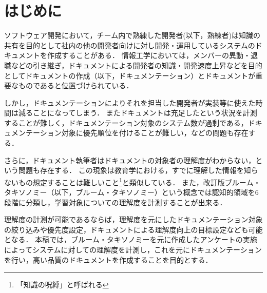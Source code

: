 \section{はじめに}
ソフトウェア開発において，チーム内で熟練した開発者(以下，熟練者)は知識の共有を目的として社内の他の開発者向けに対し開発・運用しているシステムのドキュメントを作成することがある．
情報工学においては，メンバーの異動・退職などの引き継ぎ，ドキュメントによる開発者の知識・開発速度上昇などを目的としてドキュメントの作成（以下，ドキュメンテーション）とドキュメントが重要なものであると位置づけられている\cite{bib:ozawa}．

しかし，ドキュメンテーションによりそれを担当した開発者が実装等に使えた時間は減ることになってしまう．
またドキュメントは充足したという状況を計測することが難しく，ドキュメンテーション対象のシステム数が過剰である，ドキュメンテーション対象に優先順位を付けることが難しい，などの問題も存在する．

さらに，ドキュメント執筆者はドキュメントの対象者の理解度がわからない，という問題も存在する．
この現象は教育学における，すでに理解した情報を知らないもの想定することは難しいこと\footnote{「知識の呪縛」と呼ばれる}\cite{bib:kaneda}と類似している．
また，改訂版ブルーム・タキソノミー（以下，ブルーム・タキソノミー）という概念では認知的領域を6段階に分類し，学習対象についての理解度を計測することが出来る．

理解度の計測が可能であるならば，理解度を元にしたドキュメンテーション対象の絞り込みや優先度設定，ドキュメントによる理解度向上の目標設定なども可能となる．
本稿では，ブルーム・タキソノミーを元に作成したアンケートの実施によってシステムに対しての理解度を計測し，これを元にドキュメンテーションを行い，高い品質のドキュメントを作成することを目的とする．
